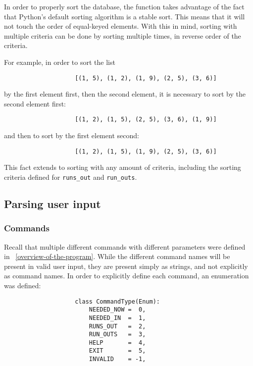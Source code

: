\documentclass{article}
\begin{document}
				In order to properly sort the database, the function takes advantage of the fact that
				Python's default sorting algorithm is a stable sort. This means that it will not touch the
				order of equal-keyed elements. With this in mind, sorting with multiple criteria can be
				done by sorting multiple times, in reverse order of the criteria.

				For example, in order to sort the list

				\begin{verbatim}
					[(1, 5), (1, 2), (1, 9), (2, 5), (3, 6)]
				\end{verbatim}

				by the first element first, then the second element, it is necessary to sort by the second
				element first:

				\begin{verbatim}
					[(1, 2), (1, 5), (2, 5), (3, 6), (1, 9)]
				\end{verbatim}

				and then to sort by the first element second:

				\begin{verbatim}
					[(1, 2), (1, 5), (1, 9), (2, 5), (3, 6)]
				\end{verbatim}

				This fact extends to sorting with any amount of criteria, including the sorting criteria
				defined for \verb|runs_out| and \verb|run_outs|.

		\subsection{Parsing user input}
			\subsubsection{Commands}
				Recall that multiple different commands with different parameters were defined in~
				\ref{overview-of-the-program}. While the different command names will be present in valid
				user input, they are present simply as strings, and not explicitly as command names. In order
				to explicitly define each command, an enumeration was defined:

				\begin{verbatim}
					class CommandType(Enum):
						NEEDED_NOW =  0,
						NEEDED_IN  =  1,
						RUNS_OUT   =  2,
						RUN_OUTS   =  3,
						HELP       =  4,
						EXIT       =  5,
						INVALID    = -1,
				\end{verbatim}
\end{document}

